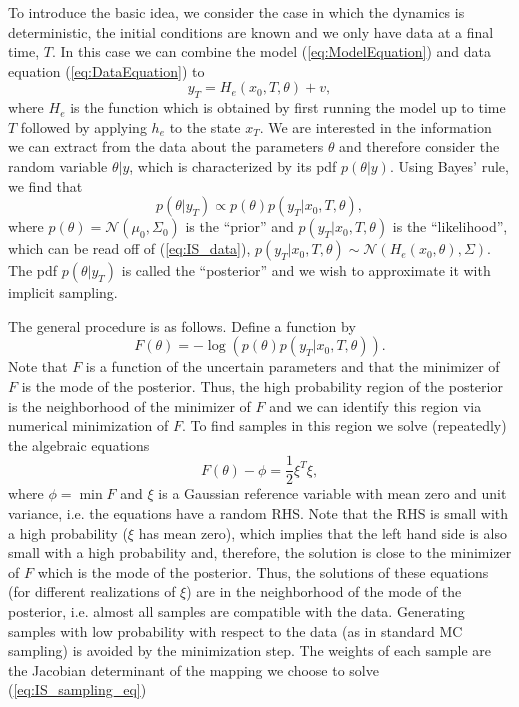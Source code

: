 \documentclass[11pt]{article}
\begin{document}
To introduce the basic idea,
we consider the case in which the dynamics is deterministic, the initial conditions are known and we only have data at a final time, $T$.
In this case we can combine the model (\ref{eq:ModelEquation}) and data equation (\ref{eq:DataEquation}) to
\begin{equation}
\label{eq:IS_data}
	y_T = H_e(x_0,T,\theta)+v,
\end{equation}
where $H_e$ is the function which is obtained by first running the model up
to time $T$ followed by applying $h_e$ to the state $x_T$. We are interested in the information we can extract from the data about the parameters $\theta$ and
therefore consider the random variable $\theta|y$, which is characterized by its pdf $p(\theta|y)$. Using Bayes' rule, we find that
\begin{equation}
\label{eq:post}
	p(\theta|y_T) \propto p(\theta)p(y_T|x_0,T,\theta),
\end{equation}
where  $p(\theta) = \mathcal{N}(\mu_0,\Sigma_0)$ is the ``prior'' and $p(y_T|x_0,T,\theta)$ is the ``likelihood'',
which can be read off of (\ref{eq:IS_data}), $p(y_T|x_0,T,\theta)\sim \mathcal{N}(H_e(x_0,\theta),\Sigma)$.
The pdf $p(\theta|y_T)$  is called the ``posterior'' and we wish to approximate it with implicit sampling. 

The general procedure is as follows. Define a function by
\begin{equation}
	F(\theta)= -\log \left(p(\theta)p(y_T|x_0,T,\theta)\right).
\end{equation}
Note that $F$ is a function of the uncertain parameters and that the minimizer of $F$ is the mode of the posterior. Thus, the high probability region of the posterior is the neighborhood of the minimizer of $F$ and we can identify this region via numerical minimization of $F$. To find samples in this region we solve (repeatedly) the algebraic equations
\begin{equation}
\label{eq:IS_sampling_eq}
	F(\theta)-\phi = \frac{1}{2}\xi^T\xi,
\end{equation}
where $\phi = \min F$ and $\xi$ is a Gaussian reference variable with mean zero and unit variance, i.e. the equations have a random RHS.
Note that the RHS is small with a high probability ($\xi$ has mean zero), which implies that the left hand side is also small with a high probability and, therefore, the solution is close to the minimizer of $F$ which is the mode of the posterior.
Thus, the solutions of these equations (for different realizations of $\xi$) are in the neighborhood of the mode of the posterior, i.e. almost all samples are compatible with the data.
Generating samples with low probability with respect to the data (as in standard MC sampling) is avoided by the minimization step. The weights of each sample are the Jacobian determinant of the mapping we choose to solve (\ref{eq:IS_sampling_eq})  
\end{document}
